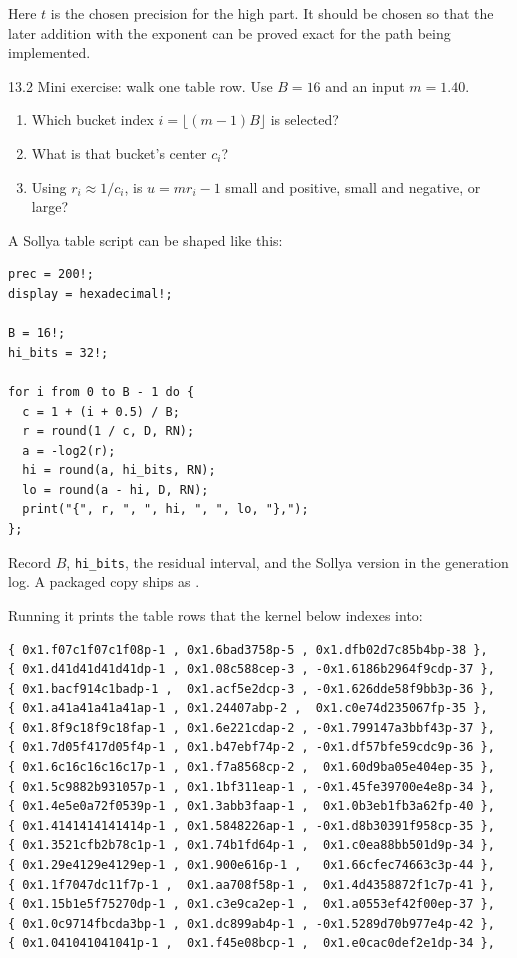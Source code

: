 \documentclass[manuscript, nonacm]{acmart}
\begin{document}
    Here $t$ is the chosen precision for the high part. It should be chosen so
    that the later addition with the exponent can be proved exact for the path
    being implemented.


    \begin{checkpoint}{13.2}
        Mini exercise: walk one table row. Use $B = 16$ and an input
        $m = 1.40$.
        \begin{enumerate}
            \item Which bucket index $i = \lfloor (m-1)B \rfloor$ is selected?
            \item What is that bucket's center $c_i$?
            \item Using $r_i \approx 1/c_i$, is $u = mr_i - 1$ small and positive,
            small and negative, or large?
        \end{enumerate}
    \end{checkpoint}

    A Sollya table script can be shaped like this:
    \begin{lstlisting}[style=sollya]
prec = 200!;
display = hexadecimal!;

B = 16!;
hi_bits = 32!;

for i from 0 to B - 1 do {
  c = 1 + (i + 0.5) / B;
  r = round(1 / c, D, RN);
  a = -log2(r);
  hi = round(a, hi_bits, RN);
  lo = round(a - hi, D, RN);
  print("{", r, ", ", hi, ", ", lo, "},");
};
    \end{lstlisting}

    Record $B$, \texttt{hi\_bits}, the residual interval, and the Sollya version in
    the generation log. A packaged copy ships as
    .

    Running it prints the table rows that the kernel below indexes into:

    \begin{lstlisting}[style=output]
{ 0x1.f07c1f07c1f08p-1 , 0x1.6bad3758p-5 , 0x1.dfb02d7c85b4bp-38 },
{ 0x1.d41d41d41d41dp-1 , 0x1.08c588cep-3 , -0x1.6186b2964f9cdp-37 },
{ 0x1.bacf914c1badp-1 ,  0x1.acf5e2dcp-3 , -0x1.626dde58f9bb3p-36 },
{ 0x1.a41a41a41a41ap-1 , 0x1.24407abp-2 ,  0x1.c0e74d235067fp-35 },
{ 0x1.8f9c18f9c18fap-1 , 0x1.6e221cdap-2 , -0x1.799147a3bbf43p-37 },
{ 0x1.7d05f417d05f4p-1 , 0x1.b47ebf74p-2 , -0x1.df57bfe59cdc9p-36 },
{ 0x1.6c16c16c16c17p-1 , 0x1.f7a8568cp-2 ,  0x1.60d9ba05e404ep-35 },
{ 0x1.5c9882b931057p-1 , 0x1.1bf311eap-1 , -0x1.45fe39700e4e8p-34 },
{ 0x1.4e5e0a72f0539p-1 , 0x1.3abb3faap-1 ,  0x1.0b3eb1fb3a62fp-40 },
{ 0x1.4141414141414p-1 , 0x1.5848226ap-1 , -0x1.d8b30391f958cp-35 },
{ 0x1.3521cfb2b78c1p-1 , 0x1.74b1fd64p-1 ,  0x1.c0ea88bb501d9p-34 },
{ 0x1.29e4129e4129ep-1 , 0x1.900e616p-1 ,   0x1.66cfec74663c3p-44 },
{ 0x1.1f7047dc11f7p-1 ,  0x1.aa708f58p-1 ,  0x1.4d4358872f1c7p-41 },
{ 0x1.15b1e5f75270dp-1 , 0x1.c3e9ca2ep-1 ,  0x1.a0553ef42f00ep-37 },
{ 0x1.0c9714fbcda3bp-1 , 0x1.dc899ab4p-1 , -0x1.5289d70b977e4p-42 },
{ 0x1.041041041041p-1 ,  0x1.f45e08bcp-1 ,  0x1.e0cac0def2e1dp-34 },
    \end{lstlisting}
\end{document}
